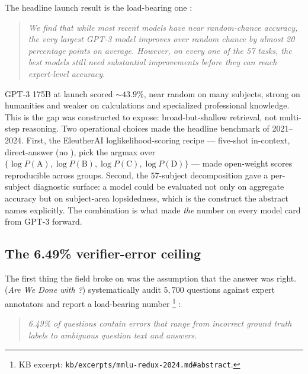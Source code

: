 The headline launch result is the load-bearing one
\citep[\S{}abstract]{hendrycks2021-mmlu}:

\begin{quote}\itshape
We find that while most recent models have near random-chance accuracy,
the very largest GPT-3 model improves over random chance by almost 20
percentage points on average. However, on every one of the 57 tasks,
the best models still need substantial improvements before they can
reach expert-level accuracy.
\end{quote}

GPT-3 175B at launch scored $\sim 43.9\%$, near random on many subjects,
strong on humanities and weaker on calculations and specialized
professional knowledge. This is the gap  was constructed to expose:
broad-but-shallow retrieval, not multi-step reasoning. Two operational
choices made  the headline benchmark of 2021--2024. First, the
EleutherAI \texttt{} loglikelihood-scoring recipe
\citep[\S{}\ref{sec:knowledge-mmlu}]{hendrycks2021-mmlu} --- five-shot
in-context, direct-answer (no ), pick the argmax over
$\{\log P(\text{A}), \log P(\text{B}), \log P(\text{C}),
\log P(\text{D})\}$ --- made open-weight scores reproducible across
groups. Second, the $57$-subject decomposition gave a per-subject
diagnostic surface: a model could be evaluated not only on aggregate
accuracy but on subject-area lopsidedness, which is the construct the
abstract names explicitly. The combination is what made  \emph{the}
number on every model card from GPT-3 forward.

\subsection{The 6.49\% verifier-error ceiling}
\label{sec:knowledge-redux}

The first thing the field broke on  was the assumption that the
answer  was right. \citet{mmlu-redux-2024} (\emph{Are We Done with
?}) systematically audit $5{,}700$  questions against expert
annotators and report a load-bearing number%
\footnote{KB excerpt: \texttt{kb/excerpts/mmlu-redux-2024.md\#abstract}.}
\citep[\S{}abstract]{mmlu-redux-2024}:

\begin{quote}\itshape
6.49\% of  questions contain errors that range from incorrect
ground truth labels to ambiguous question text and answers.
\end{quote}

